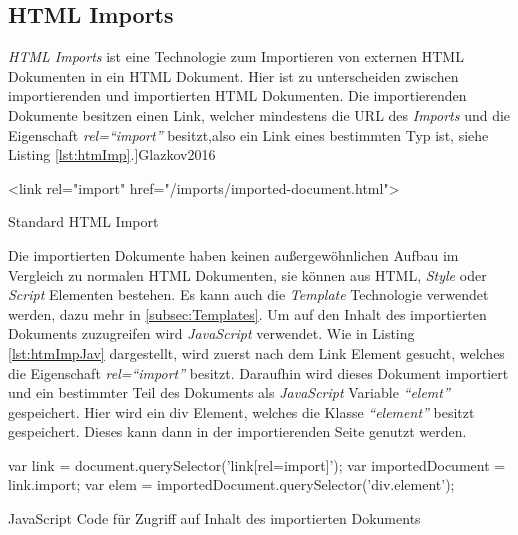 \documentclass[12pt, paper=a4, bibtotoc, toc=listof, headsepline=true]{scrreprt}
\renewcommand{\smfootcite}[2][2]{\relax}
\begin{document}
			\subsection{HTML Imports}
			\emph{\ac{HTML} Imports} ist eine Technologie zum Importieren von externen \ac{HTML} Dokumenten in ein \ac{HTML} Dokument. Hier ist zu unterscheiden zwischen importierenden und importierten \ac{HTML} Dokumenten. Die importierenden Dokumente besitzen einen Link, welcher mindestens die \ac{URL} des \emph{Imports} und die Eigenschaft \emph{rel=\enquote{import}} besitzt,also ein Link eines bestimmten Typ ist, siehe Listing \ref{lst:htmImp}.\smfootcite[ vgl.][]{Glazkov2016} 
				\begin{listing}
				\begin{HTMLcode*}{}
 <link rel="import" href="/imports/imported-document.html">
				\end{HTMLcode*}
				\caption{Standard HTML Import}
				\label{lst:htmImp}
				\end{listing}
			Die importierten Dokumente haben keinen außergewöhnlichen Aufbau im Vergleich zu normalen \ac{HTML} Dokumenten, sie können aus \ac{HTML}, \emph{Style} oder \emph{Script} Elementen bestehen. Es kann auch die \emph{Template} Technologie verwendet werden, dazu mehr in \ref{subsec:Templates}.
			Um auf den Inhalt des importierten Dokuments zuzugreifen wird \emph{JavaScript} verwendet. Wie in Listing \ref{lst:htmImpJav} dargestellt, wird zuerst nach dem Link Element gesucht, welches die Eigenschaft \emph{rel=\enquote{import}} besitzt. Daraufhin wird dieses Dokument importiert und ein bestimmter Teil des Dokuments als \emph{JavaScript} Variable \emph{\enquote{elemt}} gespeichert. Hier wird ein div Element, welches die Klasse \emph{\enquote{element}} besitzt gespeichert. Dieses kann dann in der importierenden Seite genutzt werden. 
			\begin{listing}
			\begin{JavaScriptcode*}{}
var link = document.querySelector('link[rel=import]');
var importedDocument = link.import;
var elem = importedDocument.querySelector('div.element');
			\end{JavaScriptcode*}
			\caption{JavaScript Code für Zugriff auf Inhalt des importierten Dokuments}
			\label{lst:htmImpJav}
			\end{listing} 
			
\end{document}
